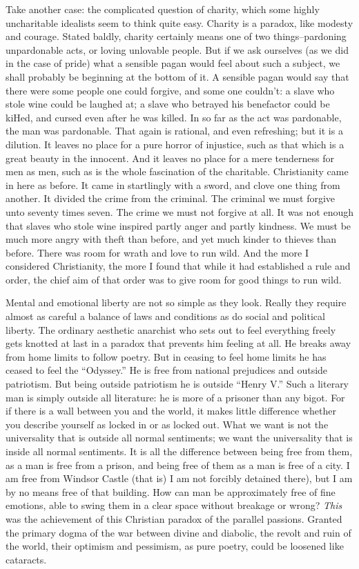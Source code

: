 \documentclass{book}
\begin{document}
Take another case: the complicated question of charity, which some highly uncharitable idealists seem to think quite easy. Charity is a paradox, like modesty and courage. Stated baldly, charity certainly means one of two things–pardoning unpardonable acts, or loving unlovable people. But if we ask ourselves (as we did in the case of pride) what a sensible pagan would feel about such a subject, we shall probably be beginning at the bottom of it. A sensible pagan would say that there were some people one could forgive, and some one couldn’t: a slave who stole wine could be laughed at; a slave who betrayed his benefactor could be kiHed, and cursed even after he was killed. In so far as the act was pardonable, the man was pardonable. That again is rational, and even refreshing; but it is a dilution. It leaves no place for a pure horror of injustice, such as that which is a great beauty in the innocent. And it leaves no place for a mere tenderness for men as men, such as is the whole fascination of the charitable. Christianity came in here as before. It came in startlingly with a sword, and clove one thing from another. It divided the crime from the criminal. The criminal we must forgive unto seventy times seven. The crime we must not forgive at all. It was not enough that slaves who stole wine inspired partly anger and partly kindness. We must be much more angry with theft than before, and yet much kinder to thieves than before. There was room for wrath and love to run wild. And the more I considered Christianity, the more I found that while it had established a rule and order, the chief aim of that order was to give room for good things to run wild.

Mental and emotional liberty are not so simple as they look. Really they require almost as careful a balance of laws and conditions as do social and political liberty. The ordinary aesthetic anarchist who sets out to feel everything freely gets knotted at last in a paradox that prevents him feeling at all. He breaks away from home limits to follow poetry. But in ceasing to feel home limits he has ceased to feel the “Odyssey.” He is free from national prejudices and outside patriotism. But being outside patriotism he is outside “Henry V.” Such a literary man is simply outside all literature: he is more of a prisoner than any bigot. For if there is a wall between you and the world, it makes little difference whether you describe yourself as locked in or as locked out. What we want is not the universality that is outside all normal sentiments; we want the universality that is inside all normal sentiments. It is all the difference between being free from them, as a man is free from a prison, and being free of them as a man is free of a city. I am free from Windsor Castle (that is) I am not forcibly detained there), but I am by no means free of that building. How can man be approximately free of fine emotions, able to swing them in a clear space without breakage or wrong? \emph{This} was the achievement of this Christian paradox of the parallel passions. Granted the primary dogma of the war between divine and diabolic, the revolt and ruin of the world, their optimism and pessimism, as pure poetry, could be loosened like cataracts.
\end{document}
